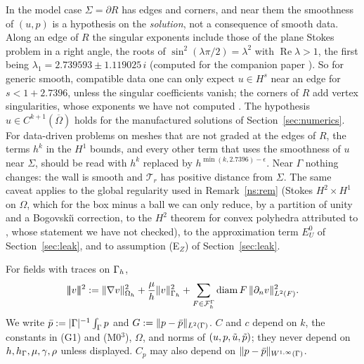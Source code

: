 \begin{remark}\label{set:rem:corner}
In the model case $\Sigma=\partial R$ has edges and corners, and near them the smoothness of $(u,p)$ is a hypothesis on the \emph{solution}, not a consequence of smooth data. Along an edge of $R$ the singular exponents include those of the plane Stokes problem in a right angle, the roots of $\sin^2(\lambda\pi/2)=\lambda^2$ with $\operatorname{Re}\lambda>1$, the first being $\lambda_1=2.739593\pm1.119025\,i$ (computed for the companion paper \cite{PadhiLong2D}). So for generic smooth, compatible data one can only expect $u\in H^s$ near an edge for $s<1+2.7396$, unless the singular coefficients vanish; the corners of $R$ add vertex singularities, whose exponents we have not computed \cite{Dauge1989}. The hypothesis $u\in C^{k+1}(\overline\Omega)$ holds for the manufactured solutions of Section~\ref{sec:numerics}. For data-driven problems on meshes that are not graded at the edges of $R$, the terms $h^k$ in the $H^1$ bounds, and every other term that uses the smoothness of $u$ near $\Sigma$, should be read with $h^k$ replaced by $h^{\min(k,2.7396)-\epsilon}$. Near $\Gamma$ nothing changes: the wall is smooth and $\mathcal T_r$ has positive distance from $\Sigma$. The same caveat applies to the global regularity used in Remark~\ref{ns:rem} (Stokes $H^2\times H^1$ on $\Omega$, which for the box minus a ball we can only reduce, by a partition of unity and a Bogovski\u{\i} correction, to the $H^2$ theorem for convex polyhedra attributed to \cite{Dauge1989}, whose statement we have not checked), to the approximation term $E^0_U$ of Section~\ref{sec:leak}, and to assumption (E$_Z$) of Section~\ref{sec:leak}.
\end{remark}

For fields with traces on $\Gamma_h$,
\[
|\!|\!|v|\!|\!|^2:=\lVert \nabla v\rVert^2_{\Omega_h}+\frac\mu h\lVert v\rVert^2_{\Gamma_h}+\sum_{F\in\mathcal F_h^\Gamma}\operatorname{diam} F\,\lVert \partial_n v\rVert^2_{L^2(F)} .
\]
We write $\bar p:=|\Gamma|^{-1}\int_\Gamma p$ and $G:=\lVert p-\bar p\rVert_{L^2(\Gamma)}$. $C$ and $c$ depend on $k$, the constants in (G1) and (M0$^3$), $\Omega$, and norms of $(u,p,\tilde u,\tilde p)$; they never depend on $h,h_\Gamma,\mu,\gamma,\rho$ unless displayed. $C_p$ may also depend on $\lVert p-\bar p\rVert_{W^{1,\infty}(\Gamma)}$.

